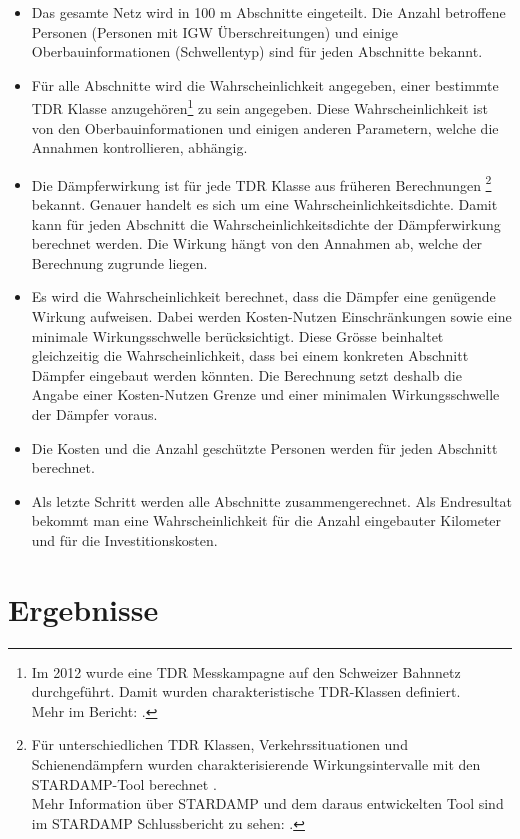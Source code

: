 \begin{itemize}
	\item Das gesamte Netz wird in 100 m Abschnitte eingeteilt. Die Anzahl betroffene Personen  (Personen mit IGW Überschreitungen) und einige Oberbauinformationen (Schwellentyp) sind für jeden Abschnitte bekannt.
	\item Für alle Abschnitte  wird die  Wahrscheinlichkeit angegeben, einer bestimmte TDR Klasse anzugehören\footnote{Im 2012 wurde eine TDR Messkampagne auf den Schweizer Bahnnetz durchgeführt. Damit wurden charakteristische TDR-Klassen definiert.\\ Mehr im Bericht: \cite{MbbmNetzM}. } zu sein angegeben. Diese Wahrscheinlichkeit ist von den  Oberbauinformationen und  einigen anderen Parametern, welche die Annahmen kontrollieren, abhängig. 
	\item  Die  Dämpferwirkung ist für jede TDR Klasse aus früheren Berechnungen \footnote{ Für unterschiedlichen  TDR Klassen, Verkehrssituationen und Schienendämpfern wurden charakterisierende Wirkungsintervalle mit den STARDAMP-Tool berechnet \parencite{sbbWCalc}. \\ Mehr Information über STARDAMP und dem daraus entwickelten Tool sind im STARDAMP Schlussbericht zu sehen:  \cite{stardRep}.} bekannt. Genauer handelt es sich um eine Wahrscheinlichkeitsdichte. Damit kann für jeden Abschnitt die Wahrscheinlichkeitsdichte der Dämpferwirkung berechnet werden. Die Wirkung hängt von den Annahmen ab, welche der Berechnung zugrunde liegen. 
	\item Es wird die Wahrscheinlichkeit berechnet, dass die Dämpfer eine genügende Wirkung aufweisen. Dabei werden Kosten-Nutzen Einschränkungen sowie eine minimale Wirkungsschwelle berücksichtigt. Diese Grösse beinhaltet gleichzeitig die Wahrscheinlichkeit, dass bei einem konkreten Abschnitt Dämpfer eingebaut werden könnten. Die Berechnung setzt deshalb die Angabe einer Kosten-Nutzen Grenze und einer minimalen Wirkungsschwelle der Dämpfer voraus. 
	\item Die Kosten und die Anzahl geschützte Personen werden für jeden Abschnitt berechnet.
	\item Als letzte Schritt werden alle Abschnitte zusammengerechnet. Als Endresultat bekommt man eine Wahrscheinlichkeit für die Anzahl eingebauter Kilometer und für die Investitionskosten.
\end{itemize}

\section{Ergebnisse} \label{S:erg}

